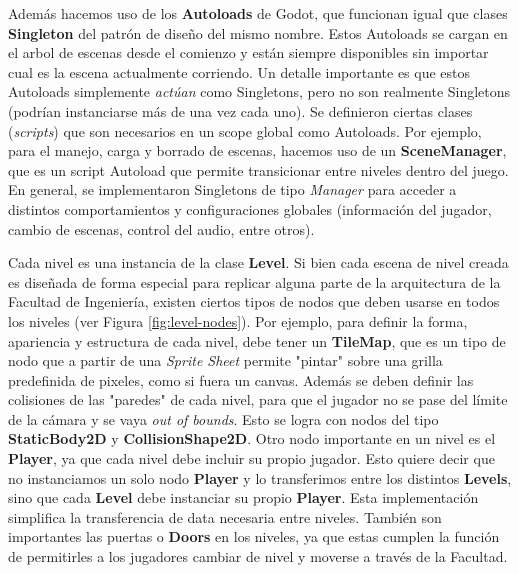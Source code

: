 
Además hacemos uso de los \textbf{Autoloads} de Godot, que funcionan igual que clases \textbf{Singleton}
del patrón de diseño del mismo nombre. Estos Autoloads se cargan en el arbol de escenas desde el comienzo
y están siempre disponibles sin importar cual es la escena actualmente corriendo. Un detalle importante es que
estos Autoloads simplemente \textit{actúan} como Singletons, pero no son realmente Singletons (podrían instanciarse
más de una vez cada uno).
Se definieron ciertas clases (\textit{scripts}) que son necesarios en un scope global como Autoloads.
Por ejemplo, para el manejo, carga y borrado de escenas, hacemos uso de un \textbf{SceneManager}, 
que es un script Autoload que permite transicionar entre niveles dentro del juego. En general, 
se implementaron Singletons de tipo \textit{Manager} para acceder a distintos comportamientos y 
configuraciones globales (información del jugador, cambio de escenas, control del audio, entre otros).

Cada nivel es una instancia de la clase \textbf{Level}. Si bien cada escena de nivel creada es diseñada
de forma especial para replicar alguna parte de la arquitectura de la Facultad de Ingeniería,
existen ciertos tipos de nodos que deben usarse en todos los niveles (ver Figura \ref{fig:level-nodes}).
Por ejemplo, para definir la forma, apariencia y estructura de cada nivel, debe tener un \textbf{TileMap},
que es un tipo de nodo que a partir de una \textit{Sprite Sheet} permite "pintar" sobre
una grilla predefinida de pixeles, como si fuera un canvas. Además se deben definir las colisiones de las 
"paredes" de cada nivel, para que el jugador no se pase del límite de la cámara y se vaya 
\textit{out of bounds}. Esto se logra con nodos del tipo \textbf{StaticBody2D} y \textbf{CollisionShape2D}.
Otro nodo importante en un nivel es el \textbf{Player}, ya que cada nivel debe incluir su propio jugador.
Esto quiere decir que no instanciamos un solo nodo \textbf{Player} y lo transferimos entre los distintos 
\textbf{Levels}, sino que cada \textbf{Level} debe instanciar su propio \textbf{Player}. Esta implementación
simplifica la transferencia de data necesaria entre niveles.
También son importantes las puertas o \textbf{Doors} en los niveles, ya que estas cumplen la función de
permitirles a los jugadores cambiar de nivel y moverse a través de la Facultad.

